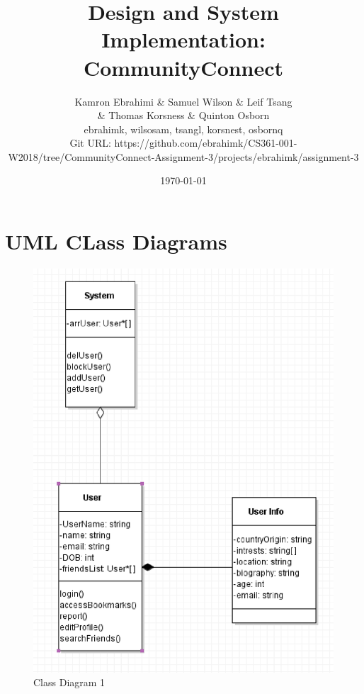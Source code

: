 \documentclass[12pt]{article}
\title{Design and System Implementation: CommunityConnect}
\author{Kamron Ebrahimi \& Samuel Wilson \& Leif Tsang \\ \& Thomas Korsness  \& Quinton Osborn \\ ebrahimk, wilsosam, tsangl, korsnest, osbornq \\ \scriptsize{Git URL: https://github.com/ebrahimk/CS361-001-W2018/tree/CommunityConnect-Assignment-3/projects/ebrahimk/assignment-3}}
\date{\today}
\begin{document}
\maketitle

\tableofcontents

\section{\bf UML CLass Diagrams}

        \begin{figure}[H]
                \includegraphics[width =\linewidth,scale=0.5]{classDiagram.eps}
                \caption{Class Diagram 1}
                \label{fig: Class Diagram 1}
        \end{figure}
\end{document}
